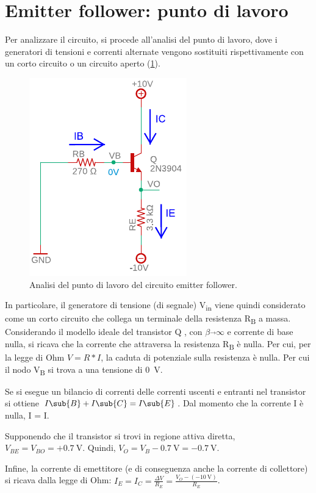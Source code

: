 \section{Emitter follower: punto di lavoro}
Per analizzare il circuito, si procede all'analisi del punto di lavoro, dove i generatori di tensioni e correnti alternate vengono sostituiti rispettivamente con un corto circuito o un circuito aperto (\Fig\ref{fig:emitterfollwer_puntodilavoro}).
\begin{figure}[h!]
	\centering
	\includegraphics[width=0.4\linewidth]{./OtherFiles/Laboratorio 1/emitter follower_punto di lavoro_printout}
	\caption{Analisi del punto di lavoro del circuito emitter follower.}
	\label{fig:emitterfollwer_puntodilavoro}
\end{figure}
In particolare, il generatore di tensione (di segnale) V\textsubscript{in} viene quindi considerato come un corto circuito che collega un terminale della resistenza R\textsubscript{B} a massa. Considerando il modello ideale del transistor Q , con $\beta\overrightarrow{}\infty$ e corrente di base nulla, si ricava che la corrente che attraversa la resistenza R\textsubscript{B} è nulla. Per cui, per la legge di Ohm $V=R*I$, la caduta di potenziale sulla resistenza è nulla. Per cui il nodo V\textsubscript{B} si trova a una tensione di \SI{0}{\volt}. 

Se si esegue un bilancio di correnti delle correnti uscenti e entranti nel transistor si ottiene $I\sub{B}+I\sub{C}=I\sub{E}$. Dal momento che la corrente I è nulla, I = I.

Supponendo che il transistor si trovi in regione attiva diretta, $V_{BE}=V_{BO}=+\SI{0.7}{\volt}$. Quindi, $V_O=V_B-\SI{0.7}{\volt}= -\SI{0.7}{\volt}$.

Infine, la corrente di emettitore (e di conseguenza anche la corrente di collettore) si ricava dalla legge di Ohm: $I_E=I_C=\frac{\Delta V}{R_E}=\frac{V_O-(-\SI{10}{\volt})}{R_E}$. 


